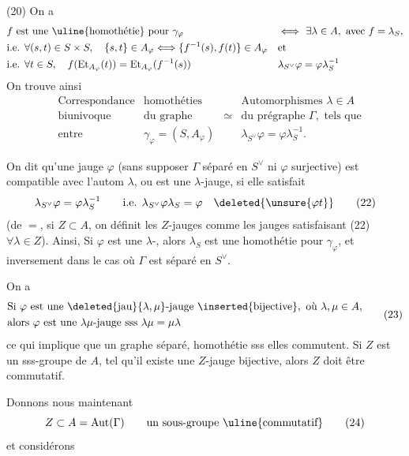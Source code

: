(20) On a 
\[
\begin{aligned}
&f\text{ est une \uline{homothétie} pour }\gamma_\varphi
 &&\Longleftrightarrow\ \exists\lambda\in A,\text{ avec }f=\lambda_S,\\
&\text{i.e. }\forall(s,t)\in S\times S,\quad\{s,t\}\in A_\varphi\Longleftrightarrow
 \{f^{-1}(s),f(t)\}\in A_\varphi &&\text{et}\\
&\text{i.e. }\forall t\in S,\quad f(\mathrm{Et}_{A_\varphi}(t))=\mathrm{Et}_{A_\varphi}(f^{-1}(s))
 &&\lambda_{S^\vee}\varphi=\varphi\lambda_S^{-1}
\end{aligned}
\]
On trouve ainsi
\[
 \begin{aligned}
 &\text{Correspondance} &\text{homothéties} &&\text{Automorphismes }\lambda\in A\\
 &\text{biunivoque} &\text{du graphe} &\simeq&\text{du prégraphe }\Gamma,\text{ tels que}\\
 &\text{entre} &\gamma_\varphi=(S,A_\varphi) &&\lambda_{S^\vee}\varphi=\varphi\lambda_S^{-1}.
 \end{aligned}\tag*{(21)}
\]

On dit qu'une jauge $\varphi$  (sans supposer  $\Gamma$
séparé en $S^\vee$ ni $\varphi$ surjective) est compatible avec
l'autom $\lambda$, ou est une $\lambda$-jauge, si elle satisfait
\[
 \lambda_{S^\vee}\varphi=\varphi\lambda_S^{-1}\qquad\text{i.e. }\lambda_{S^\vee}\varphi\lambda_S=\varphi
 \quad\deleted{\unsure{\varphi t}}\tag*{(22)}
\]
(de $=$, si $Z\subset A$, on définit les $Z$-jauges
comme les jauges satisfaisant (22) $\forall\lambda\in Z$).
Ainsi, Si $\varphi$ est une $\lambda$-, alors \deleted{\unsure{\varphi}} $\lambda_S$ est
une homothétie pour $\gamma_\varphi$, et inversement dans
le cas où $\Gamma$ est séparé en $S^\vee$.

 On a
\[
\begin{aligned}
&\text{Si }\varphi\text{ est une }\deleted{\text{jau}}\{\lambda,\mu\}\text{-jauge }\inserted{\text{bijective}},
 \text{ où }\lambda,\mu\in A,\\
&\text{alors }\varphi\text{ est une }\lambda\mu\text{-jauge sss }\lambda\mu=\mu\lambda
\end{aligned}\tag*{(23)}
\]
ce qui implique que  un graphe séparé,
   homothétie sss elles commutent.
Si $Z$ est un sss-groupe de $A$, tel qu'il existe une $Z$-jauge
bijective, alors $Z$ doit être commutatif.

Donnons nous maintenant 
\[
 Z\subset A=\mathrm{Aut}(\Gamma)\qquad\text{un sous-groupe \uline{commutatif}}
 \tag*{(24)}
\]
et considérons 

